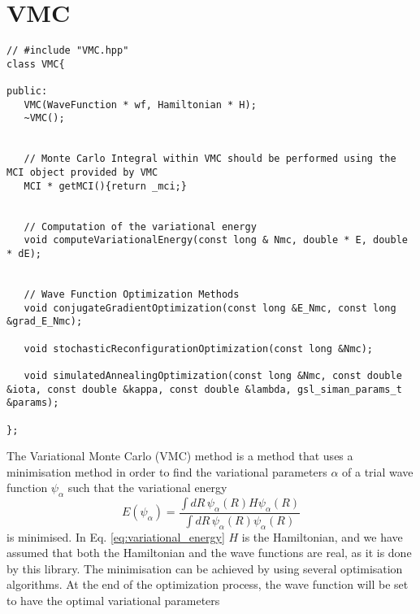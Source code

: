 \documentclass[11pt,a4paper,twoside]{article}
\begin{document}



\section{VMC} %
\label{sec:vmc}

\begin{lstlisting}
// #include "VMC.hpp"
class VMC{

public:
   VMC(WaveFunction * wf, Hamiltonian * H);
   ~VMC();


   // Monte Carlo Integral within VMC should be performed using the MCI object provided by VMC
   MCI * getMCI(){return _mci;}


   // Computation of the variational energy
   void computeVariationalEnergy(const long & Nmc, double * E, double * dE);


   // Wave Function Optimization Methods
   void conjugateGradientOptimization(const long &E_Nmc, const long &grad_E_Nmc);

   void stochasticReconfigurationOptimization(const long &Nmc);

   void simulatedAnnealingOptimization(const long &Nmc, const double &iota, const double &kappa, const double &lambda, gsl_siman_params_t &params);

};
\end{lstlisting}

The Variational Monte Carlo (VMC) method is a method that uses a minimisation method in order to find the variational parameters $\alpha$ of a trial wave function $\psi_{\alpha}$ such that the variational energy
\begin{equation}
   E(\psi_{\alpha}) = \frac{\int dR \, \psi_{\alpha}(R) H \psi_{\alpha}(R)}{\int dR \, \psi_{\alpha}(R) \psi_{\alpha}(R)}  \label{eq:variational_energy}
\end{equation}
is minimised.
In Eq. \eqref{eq:variational_energy} $H$ is the Hamiltonian, and we have assumed that both the Hamiltonian and the wave functions are real, as it is done by this library.
The minimisation can be achieved by using several optimisation algorithms. At the end of the optimization process, the wave function will be set to have the optimal variational parameters
\end{document}

